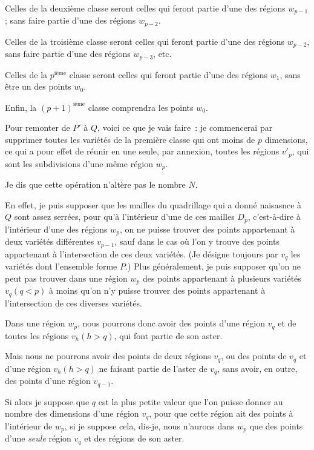 \documentclass{article}
\begin{document}
Celles de la deuxième classe seront celles qui feront partie d'une des régions $w_{p-1}$; sans faire partie d'une des régions $w_{p-2}$.

Celles de la troisième classe seront celles qui feront partie d'une des régions $w_{p-2}$, sans faire partie d'une des régions $w_{p-3}$, etc.

Celles de la $p^{\text{ième}}$ classe seront celles qui feront partie d'une des régions $w_{1}$, sans être un des points $w_{0}$.

Enfin, la $(p + 1)^{\text{ième}}$ classe comprendra les points $w_{0}$.

Pour remonter de $P'$ à $Q$, voici ce que je vais faire~: je commencerai par supprimer toutes les variétés de la première classe qui ont moins de $p$ dimensions, ce qui a pour effet de réunir en une seule, par annexion, toutes les régions $v'_{p}$, qui sont les subdivisions d'une même région $w_{p}$.

Je dis que cette opération n'altère pas le nombre $N$.

En effet, je puis supposer que les mailles du quadrillage qui a donné naisasnce à $Q$ sont assez serrées, pour qu'à l'intérieur d'une de ces mailles $D_{p}$, c'est-à-dire à l'intérieur d'une des régions $w_{p}$, on ne puisse trouver des points appartenant à deux variétés différentes $v_{p-1}$, sauf dans le cas où l'on y trouve des points appartenant à l'intersection de ces deux variétés. (Je désigne toujours par $v_{q}$ les variétés dont l'ensemble forme $P$.) Plus généralement, je puis supposer qu'on ne peut pas trouver dans une région $w_{p}$ des points appartenant à plusieurs variétés $v_{q} (q < p)$ à moins qu'on n'y puisse trouver des points appartenant à l'intersection de ces diverses variétés.

Dans une région $w_{p}$, nous pourrons donc avoir des points d'une région $v_{q}$ et de toutes les régions $v_{h} (h > q)$, qui font partie de son aster.

Mais nous ne pourrons avoir des points de deux régions $v_{q}$, ou des points de $v_{q}$ et d'une région $v_{h} (h > q)$ ne faisant partie de l'aster de $v_{q}$, sans avoir, en outre, des points d'une région $v_{q-1}$.

Si alors je suppose que $q$ est la plus petite valeur que l'on puisse donner au nombre des dimensions d'une région $v_{q}$, pour que cette région ait des points à l'intérieur de $w_{p}$, si je suppose cela, dis-je, nous n'aurons dans $w_{p}$ que des points d'une \emph{seule} région $v_{q}$ et des régions de son aster.
\end{document}
